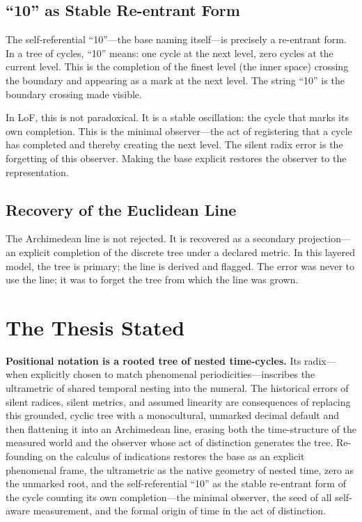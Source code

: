 \documentclass[12pt,a4paper]{article}
\theoremstyle{definition}
\theoremstyle{remark}
\begin{document}
\subsection{``10'' as Stable Re-entrant Form}

The self-referential ``10''---the base naming itself---is precisely a re-entrant form. In a tree of cycles, ``10'' means: one cycle at the next level, zero cycles at the current level. This is the completion of the finest level (the inner space) crossing the boundary and appearing as a mark at the next level. The string ``10'' is the boundary crossing made visible.

In LoF, this is not paradoxical. It is a stable oscillation: the cycle that marks its own completion. This is the minimal observer---the act of registering that a cycle has completed and thereby creating the next level. The silent radix error is the forgetting of this observer. Making the base explicit restores the observer to the representation.

\subsection{Recovery of the Euclidean Line}

The Archimedean line is not rejected. It is recovered as a secondary projection---an explicit completion of the discrete tree under a declared metric. In this layered model, the tree is primary; the line is derived and flagged. The error was never to use the line; it was to forget the tree from which the line was grown.

\section{The Thesis Stated}

\textbf{Positional notation is a rooted tree of nested time-cycles.} Its radix---when explicitly chosen to match phenomenal periodicities---inscribes the ultrametric of shared temporal nesting into the numeral. The historical errors of silent radices, silent metrics, and assumed linearity are consequences of replacing this grounded, cyclic tree with a monocultural, unmarked decimal default and then flattening it into an Archimedean line, erasing both the time-structure of the measured world and the observer whose act of distinction generates the tree. Re-founding on the calculus of indications restores the base as an explicit phenomenal frame, the ultrametric as the native geometry of nested time, zero as the unmarked root, and the self-referential ``10'' as the stable re-entrant form of the cycle counting its own completion---the minimal observer, the seed of all self-aware measurement, and the formal origin of time in the act of distinction.
\end{document}
